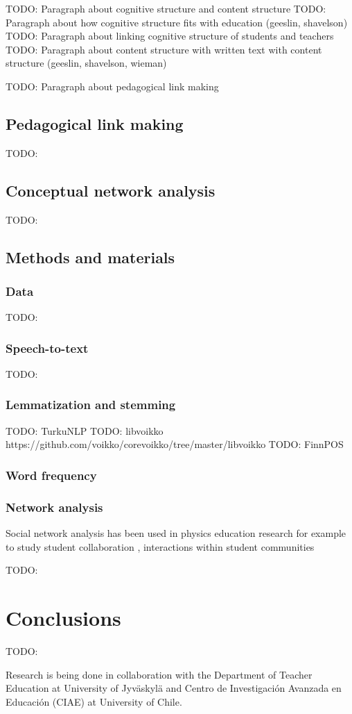 \documentclass[utf8,english]{gradu3}
\begin{document}
TODO: Paragraph about cognitive structure and content structure
TODO: Paragraph about how cognitive structure fits with education (geeslin, shavelson)
TODO: Paragraph about linking cognitive structure of students and teachers
TODO: Paragraph about content structure with written text with content structure (geeslin, shavelson, wieman)

TODO: Paragraph about pedagogical link making

\section{Pedagogical link making}
TODO: \parencite{scott2011pedagogical}
\section{Conceptual network analysis}
TODO: \parencite{mclinden2013concept,fischer2014quality, vargas}



\section{Methods and materials}

\subsection{Data}
  TODO: \parencite{fischer2014quality}
\subsection{Speech-to-text}
  TODO: \parencite{enarvi2018modeling}
\subsection{Lemmatization and stemming}
  TODO: TurkuNLP \parencite{kanerva2018turku}
  TODO: libvoikko https://github.com/voikko/corevoikko/tree/master/libvoikko
  TODO: FinnPOS \parencite{silfverberg2016finnpos}
\subsection{Word frequency}
\subsection{Network analysis}
Social network analysis has been used in physics education research for example to study student collaboration \parencite{vargas2018correlation}, interactions within student communities \parencite{brewe2012investigating} 


TODO:
\chapter{Conclusions}
TODO:

Research is being done in collaboration with the Department of Teacher Education at University of Jyväskylä and Centro de Investigación Avanzada en Educación (CIAE) at University of Chile.
 
\printbibliography
\end{document}
